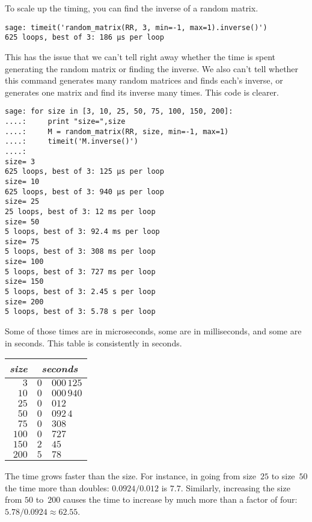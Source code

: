 To scale up the timing, you can find the inverse of a random matrix.
\begin{lstlisting}
sage: timeit('random_matrix(RR, 3, min=-1, max=1).inverse()')
625 loops, best of 3: 186 µs per loop
\end{lstlisting}
This has the issue that we can't tell right away  
whether the time is spent generating
the random matrix or finding the inverse.
We also can't tell whether
this command generates many random matrices and finds 
each's inverse,
or generates one matrix and find its inverse many times.
This code is clearer.
\begin{lstlisting}
sage: for size in [3, 10, 25, 50, 75, 100, 150, 200]:
....:     print "size=",size
....:     M = random_matrix(RR, size, min=-1, max=1)
....:     timeit('M.inverse()')
....: 
size= 3
625 loops, best of 3: 125 µs per loop
size= 10
625 loops, best of 3: 940 µs per loop
size= 25
25 loops, best of 3: 12 ms per loop
size= 50
5 loops, best of 3: 92.4 ms per loop
size= 75
5 loops, best of 3: 308 ms per loop
size= 100
5 loops, best of 3: 727 ms per loop
size= 150
5 loops, best of 3: 2.45 s per loop
size= 200
5 loops, best of 3: 5.78 s per loop
\end{lstlisting}
Some of those times are in microseconds, some are in milliseconds, and some
are in seconds.
This table is consistently in seconds.
\begin{center}
  \begin{tabular}{r|r@{.}l}
    \textit{size}     &\multicolumn{2}{c}{\textit{seconds}}  \\  \hline
    $3$      &$0$ &$000\,125$ \\
    $10$     &$0$ &$000\,940$ \\
    $25$     &$0$ &$012$ \\
    $50$     &$0$ &$092\,4$ \\
    $75$     &$0$ &$308$ \\
    $100$    &$0$ &$727$ \\
    $150$    &$2$ &$45$ \\
    $200$    &$5$ &$78$ 
  \end{tabular}
\end{center}
The time grows faster than the size.
For instance, in going from size~$25$ to size~$50$ the time more than
doubles: $0.0924/0.012$ is $7.7$.
Similarly, increasing the size from $50$ to~$200$ causes the time to 
increase by much more than a factor of four: $5.78/0.0924\approx 62.55$. 


